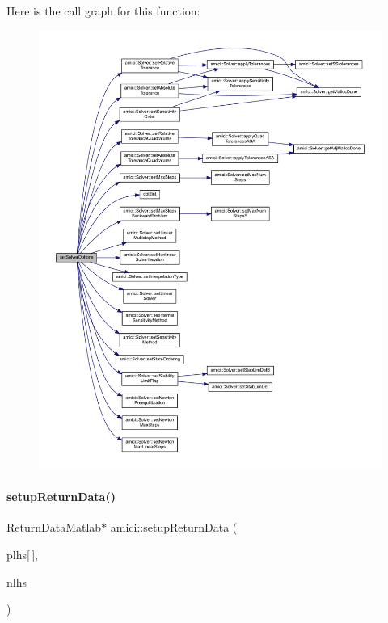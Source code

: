 Here is the call graph for this function\+:
\nopagebreak
\begin{figure}[H]
\begin{center}
\leavevmode
\includegraphics[width=350pt]{namespaceamici_aab6be0027d918715e2ba50828088110b_cgraph}
\end{center}
\end{figure}
\mbox{\label{namespaceamici_a91a3ac85998f7dd60d633882e9504b07}} 
\paragraph{\texorpdfstring{setupReturnData()}{setupReturnData()}}
{\footnotesize\ttfamily Return\+Data\+Matlab$\ast$ amici\+::setup\+Return\+Data (\begin{DoxyParamCaption}\item[{mx\+Array $\ast$}]{plhs\mbox{[}$\,$\mbox{]},  }\item[{int}]{nlhs }\end{DoxyParamCaption})}

